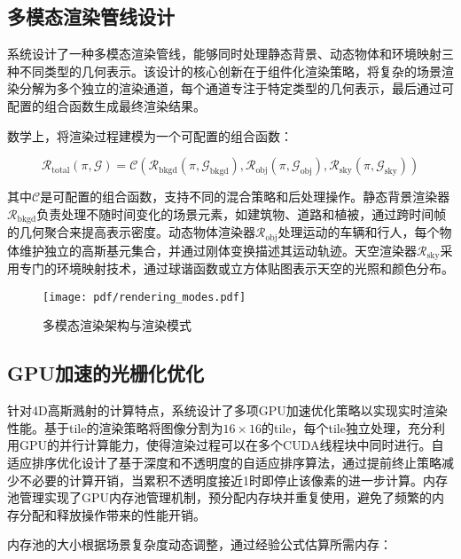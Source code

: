 \subsection{多模态渲染管线设计}

系统设计了一种多模态渲染管线，能够同时处理静态背景、动态物体和环境映射三种不同类型的几何表示。该设计的核心创新在于组件化渲染策略，将复杂的场景渲染分解为多个独立的渲染通道，每个通道专注于特定类型的几何表示，最后通过可配置的组合函数生成最终渲染结果。

数学上，将渲染过程建模为一个可配置的组合函数：

\begin{equation}
\mathcal{R}_{\text{total}}(\pi, \mathcal{G}) = \mathcal{C}(\mathcal{R}_{\text{bkgd}}(\pi, \mathcal{G}_{\text{bkgd}}), \mathcal{R}_{\text{obj}}(\pi, \mathcal{G}_{\text{obj}}), \mathcal{R}_{\text{sky}}(\pi, \mathcal{G}_{\text{sky}}))
\label{eq:modular_rendering}
\end{equation}

其中$\mathcal{C}$是可配置的组合函数，支持不同的混合策略和后处理操作。静态背景渲染器$\mathcal{R}_{\text{bkgd}}$负责处理不随时间变化的场景元素，如建筑物、道路和植被，通过跨时间帧的几何聚合来提高表示密度。动态物体渲染器$\mathcal{R}_{\text{obj}}$处理运动的车辆和行人，每个物体维护独立的高斯基元集合，并通过刚体变换描述其运动轨迹。天空渲染器$\mathcal{R}_{\text{sky}}$采用专门的环境映射技术，通过球谐函数或立方体贴图表示天空的光照和颜色分布。

\begin{figure}[htbp]
  \centering
  \texttt{[image: pdf/rendering\_modes.pdf]}
  \caption{多模态渲染架构与渲染模式}
  \label{fig:rendering-modes}
\end{figure}

\subsection{GPU加速的光栅化优化}

针对4D高斯溅射的计算特点，系统设计了多项GPU加速优化策略以实现实时渲染性能。基于tile的渲染策略将图像分割为$16 \times 16$的tile，每个tile独立处理，充分利用GPU的并行计算能力，使得渲染过程可以在多个CUDA线程块中同时进行。自适应排序优化设计了基于深度和不透明度的自适应排序算法，通过提前终止策略减少不必要的计算开销，当累积不透明度接近1时即停止该像素的进一步计算。内存池管理实现了GPU内存池管理机制，预分配内存块并重复使用，避免了频繁的内存分配和释放操作带来的性能开销。

内存池的大小根据场景复杂度动态调整，通过经验公式估算所需内存：

